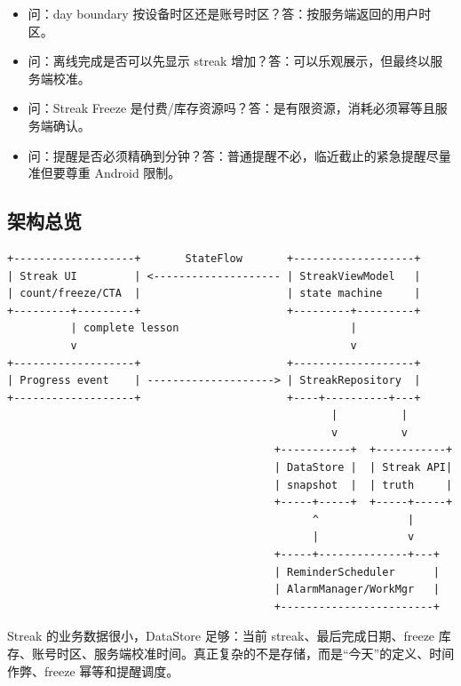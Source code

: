 \begin{itemize}
  \item 问：day boundary 按设备时区还是账号时区？答：按服务端返回的用户时区。
  \item 问：离线完成是否可以先显示 streak 增加？答：可以乐观展示，但最终以服务端校准。
  \item 问：Streak Freeze 是付费/库存资源吗？答：是有限资源，消耗必须幂等且服务端确认。
  \item 问：提醒是否必须精确到分钟？答：普通提醒不必，临近截止的紧急提醒尽量准但要尊重 Android 限制。
\end{itemize}

\subsection{架构总览}

\begin{lstlisting}
+-------------------+       StateFlow       +-------------------+
| Streak UI         | <-------------------- | StreakViewModel   |
| count/freeze/CTA  |                       | state machine     |
+---------+---------+                       +---------+---------+
          | complete lesson                           |
          v                                           v
+-------------------+                       +-------------------+
| Progress event    | --------------------> | StreakRepository  |
+-------------------+                       +----+----------+---+
                                                   |          |
                                                   v          v
                                          +-----------+  +-----------+
                                          | DataStore |  | Streak API|
                                          | snapshot  |  | truth     |
                                          +-----+-----+  +-----+-----+
                                                ^              |
                                                |              v
                                          +-----+--------------+---+
                                          | ReminderScheduler      |
                                          | AlarmManager/WorkMgr   |
                                          +------------------------+
\end{lstlisting}

Streak 的业务数据很小，DataStore 足够：当前 streak、最后完成日期、freeze 库存、账号时区、服务端校准时间。真正复杂的不是存储，而是“今天”的定义、时间作弊、freeze 幂等和提醒调度。

